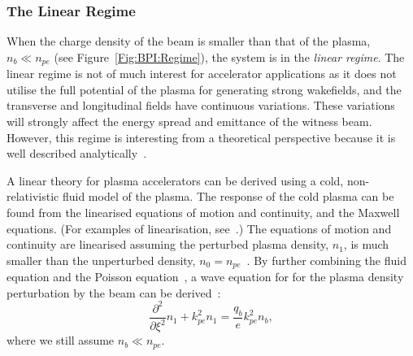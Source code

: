 \subsubsection{The Linear Regime}
\label{Int:BPI:Lin}

When the charge density of the beam is smaller than that of the plasma, $n_{b} \ll n_{pe}$ (see Figure~\ref{Fig:BPI:Regime}), the system is in the \textit{linear regime}.
The linear regime is not of much interest for accelerator applications as it does not utilise the full potential of the plasma for generating strong wakefields, and the transverse and longitudinal fields have continuous variations.
These variations will strongly affect the energy spread and emittance of the witness beam.
However, this regime is interesting from a theoretical perspective because it is well described analytically~\cite{muggli:2017}.

A linear theory for plasma accelerators can be derived using a cold, non-relativistic fluid model of the plasma.
The response of the cold plasma can be found from the linearised equations of motion and continuity, and the Maxwell equations. (For examples of linearisation, see~\cite{pecseli:2012,chen:1974}.)
The equations of motion and continuity are linearised assuming the perturbed plasma density, $n_{1}$, is much smaller than the unperturbed density, $n_{0} = n_{pe}$~\cite{chen:1987}.
By further combining the fluid equation and the Poisson equation~\cite{katsouleas:1987}, a wave equation for for the plasma density perturbation by the beam can be derived~\cite{chen:1987,muggli:2017}:
\begin{equation}
    \frac{\partial^{2}}{\partial\xi^{2}}n_{1} + k_{pe}^{2}n_{1} = \frac{q_{b}}{e}k_{pe}^{2}n_{b}, \label{EQ:BeamPlasmaWF}
\end{equation}
where we still assume $n_{b} \ll n_{pe}$.


